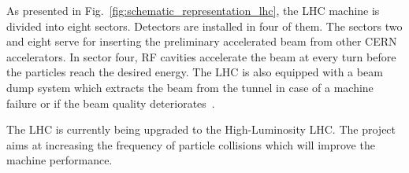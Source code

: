 As presented in Fig.~\ref{fig:schematic_representation_lhc}, the LHC machine is divided into eight sectors. Detectors are installed in four of them. The sectors two and eight serve for inserting the preliminary accelerated beam from other CERN accelerators. In sector four, RF cavities accelerate the beam at every turn before the particles reach the desired energy. The LHC is also equipped with a beam dump system which extracts the beam from the tunnel in case of a machine failure or if the beam quality deteriorates~\cite[p.~1-4]{maciejewski_cosimulation_transient_effects_in_magnets}. 

The LHC is currently being upgraded to the High-Luminosity LHC. The project aims at increasing the frequency of particle collisions which will improve the machine performance. 